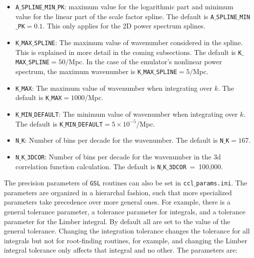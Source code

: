 \documentclass[\docopts]{\docclass}
\begin{document}
\begin{itemize}
\item {\tt A$\_$SPLINE$\_$MIN$\_$PK}: maximum value for the logarithmic part and minimum value for the linear part of the scale factor spline. The default is {\tt A$\_$SPLINE$\_$MIN$\_$PK}$=0.1$. This only applies for the 2D power spectrum splines.
\item {\tt K$\_$MAX$\_$SPLINE}: The maximum value of wavenumber considered in the spline. This is explained in more detail in the coming subsections. The default is {\tt K$\_$MAX$\_$SPLINE}$=50/$Mpc. In the case of the emulator's nonlinear power spectrum, the maximum wavenumber is {\tt K$\_$MAX$\_$SPLINE}$=5/$Mpc.
\item {\tt K$\_$MAX}: The maximum value of wavenumber when integrating over $k$. The default is {\tt K$\_$MAX}$=1000$/Mpc.
\item {\tt K$\_$MIN$\_$DEFAULT}:  The minimum value of wavenumber when integrating over $k$. The default is {\tt K$\_$MIN$\_$DEFAULT}$=5 \times 10^{-5}$/Mpc.
\item {\tt N$\_$K}: Number of bins per decade for the wavenumber. The default is {\tt N$\_$K}$=167$.
\item {\tt N$\_$K$\_$3DCOR}: Number of bins per decade for the wavenumber in the 3d correlation function calculation. 
The default is {\tt N$\_$K$\_$3DCOR}~=~100,000.
\end{itemize}

The precision parameters of {\tt GSL} routines can also be set in {\tt ccl$\_$params.ini}. The parameters are organized in a hierarchal fashion, such that more specialized parameters take precedence over more general ones. For example, there is a general tolerance parameter, a tolerance parameter for integrals, and a tolerance parameter for the Limber integral. By default all are set to the value of the general tolerance. Changing the integration tolerance changes the tolerance for all integrals but not for root-finding routines, for example, and changing the Limber integral tolerance only affects that integral and no other.
The parameters are:
\end{document}
